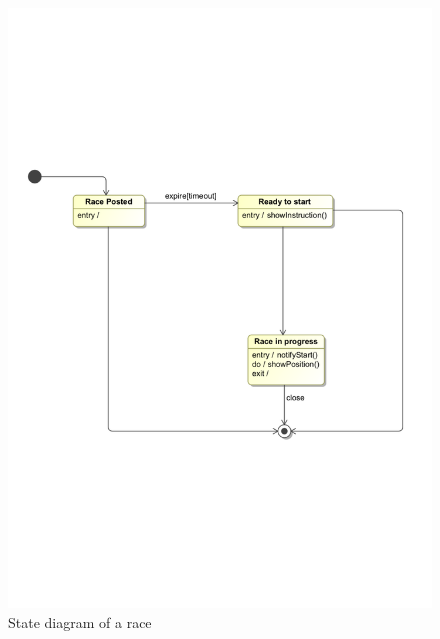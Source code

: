 \begin{figure}[H]
\includegraphics[width=0.8\linewidth]{Images/racediagram}
\caption{State diagram of a race}
\label{fig:racediagram}
\end{figure}
